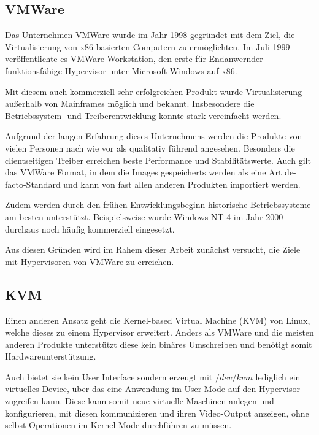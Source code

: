 

		\subsection{VMWare}

		Das Unternehmen VMWare wurde im Jahr 1998 gegründet mit dem Ziel, die Virtualisierung von x86-basierten Computern zu ermöglichten.
		Im Juli 1999 veröffentlichte es VMWare Workstation, den erste für Endanwernder funktionsfähige Hypervisor unter Microsoft Windows auf x86.

		Mit diesem auch kommerziell sehr erfolgreichen Produkt wurde Virtualisierung außerhalb von Mainframes möglich und bekannt. 
		Insbesondere die Betriebssystem- und Treiberentwicklung konnte stark vereinfacht werden. 

		Aufgrund der langen Erfahrung dieses Unternehmens werden die Produkte von vielen Personen nach wie vor als qualitativ führend angesehen. 
		Besonders die clientseitigen Treiber erreichen beste Performance und Stabilitätswerte.
		Auch gilt das VMWare Format, in dem die Images gespeicherts werden als eine Art de-facto-Standard und kann von fast allen anderen Produkten importiert werden.

		Zudem werden durch den frühen Entwicklungsbeginn historische Betriebssysteme am besten unterstützt.
		Beispielsweise wurde Windows NT 4 im Jahr 2000 durchaus noch häufig kommerziell eingesetzt.

		Aus diesen Gründen wird im Rahem dieser Arbeit zunächst versucht, die Ziele mit Hypervisoren von VMWare zu erreichen.

		\subsection{KVM}


		Einen anderen Ansatz geht die Kernel-based Virtual Machine (KVM) von Linux, welche dieses zu einem Hypervisor erweitert. 
		Anders als VMWare und die meisten anderen Produkte unterstützt diese kein binäres Umschreiben und benötigt somit Hardwareunterstützung.

		Auch bietet sie kein User Interface sondern erzeugt mit $/dev/kvm$ lediglich ein virtuelles Device, über das eine Anwendung im User Mode auf den Hypervisor zugreifen kann.
		Diese kann somit neue virtuelle Maschinen anlegen und konfigurieren, mit diesen kommunizieren und ihren Video-Output anzeigen, ohne selbst Operationen im Kernel Mode durchführen zu müssen.

